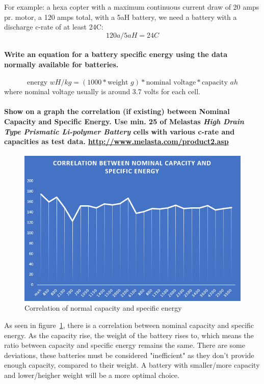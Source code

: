 \documentclass[paper=letter, fontsize=10pt]{article}
\begin{document}
For example: a hexa copter with a maximum continuous current draw of 20 amps pr. motor, a 120 amps total, with a 5aH battery, we need a battery with a discharge c-rate of at least 24C:
\[120a/5aH = 24C\]

\paragraph{Write an equation for a battery specific energy using the data normally available for batteries.}
\begin{equation}
\text{energy } wH/kg = (1000 * \text{weight } g) * \text{nominal voltage} * \text{capacity } ah
\end{equation}
where nominal voltage usually is around 3.7 volts for each cell.

\paragraph{Show on a graph the correlation (if existing) between Nominal Capacity and Specific Energy. Use min. 25 of Melastas \textit{High Drain Type Prismatic Li-polymer Battery} cells with various c-rate and capacities as test data. \url{http://www.melasta.com/product2.asp}}
\begin{figure}
\centering
\includegraphics[scale=0.6]{Figures/nomcapacity}
\caption{Correlation of normal capacity and specific energy}
\label{fig_capacity}
\end{figure}

As seen in figure~\ref{fig_capacity}, there is a correlation between nominal capacity and specific energy. As the capacity rise, the weight of the battery rises to, which means the ratio between capacity and specific energy remains the same. There are some deviations, these batteries must be considered "inefficient" as they don't provide enough capacity, compared to their weight. A battery with smaller/more capacity and lower/heigher weight will be a more optimal choice.
\end{document}
